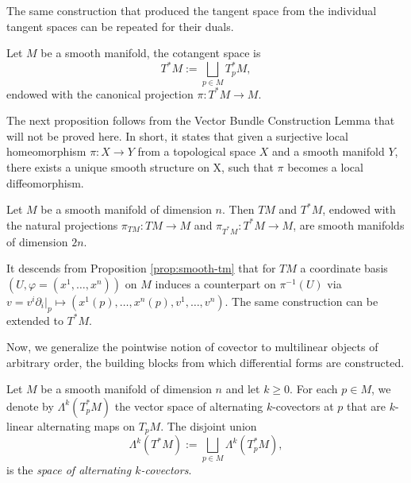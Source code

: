 \noindent The same construction that produced the tangent space from the individual tangent spaces can be repeated for their duals.

\begin{definition}\label{def:cot-space}
	Let $M$ be a smooth manifold, the cotangent space is
	\[
	T^*M := \bigsqcup_{p \in M} T_p^*M,
	\]
	endowed with the canonical projection $\pi: T^*M \to M$.
\end{definition}

The next proposition follows from the Vector Bundle Construction Lemma \cite[Lemma 10.6]{leeIntroductionSmoothManifolds2013} that will not be proved here. In short, it states that given a surjective local homeomorphism $\pi : X \to Y$ from a topological space $X$ and a smooth manifold $Y$, there exists a unique smooth structure on X, such that $\pi$ becomes a local diffeomorphism. 

\begin{proposition}\label{prop:smooth-tm}
	Let $M$ be a smooth manifold of dimension $n$. Then $TM$ and $T^*M$, endowed
	with the natural projections $\pi_{TM} : TM \to M$ and $\pi_{T^*M} : T^*M \to M$,
	are smooth manifolds of dimension $2n$.
\end{proposition}

It descends from Proposition \ref{prop:smooth-tm} that for $TM$ a coordinate basis $(U,\varphi=(x^1,\dots,x^n))$ on $M$ induces a counterpart on $\pi^{-1}(U)$ via $v = v^i \partial_i|_p \mapsto (x^1(p),\dots,x^n(p),v^1,\dots,v^n)$. The same construction can be extended to $T^*M$.

\noindent Now, we generalize the pointwise notion of covector to multilinear objects of arbitrary order, the building blocks from which differential forms are constructed.

\begin{definition}\label{def:k-covector}
	Let $M$ be a smooth manifold of dimension $n$ and let $k \geq 0$. For each $p \in M$, we denote by $\Lambda^k(T_p^*M)$ the vector space of alternating $k$-covectors at $p$ that are $k$-linear alternating maps on $T_pM$. The disjoint union
	\[
	\Lambda^k(T^*M) := \bigsqcup_{p \in M} \Lambda^k(T_p^*M),
	\]
	is the \emph{space of alternating $k$-covectors}.
\end{definition}

